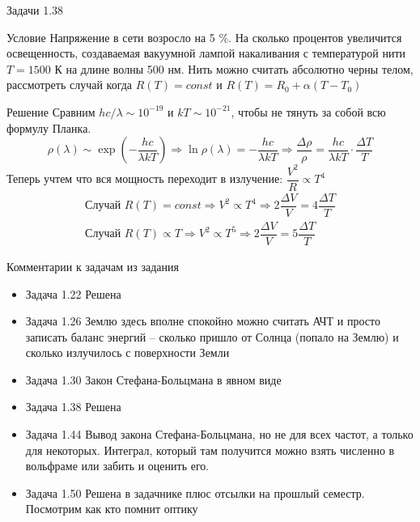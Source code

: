\documentclass[12]{beamer}
\begin{document}
\begin{frame}{Задачи 1.38}\scriptsize
\begin{block}{Условие}
Напряжение в сети возросло на 5 \%. На сколько процентов увеличится освещенность, создаваемая вакуумной лампой накаливания с температурой нити $T = 1500$ К на длине волны 500 нм. Нить можно считать абсолютно черны телом, рассмотреть случай когда $R(T) = const$ и $R(T) = R_0 + \alpha (T - T_0)$
\end{block}
\begin{block}{Решение}
Сравним $hc/\lambda \sim 10^{-19}$ и $kT\sim10^{-21}$, чтобы не тянуть за собой всю формулу Планка.
\begin{equation*}
    \rho(\lambda) \sim \exp{\left(-\dfrac{hc}{\lambda kT} \right)} \Rightarrow \ln{\rho(\lambda)} = -\dfrac{hc}{\lambda kT} \Rightarrow \dfrac{\Delta \rho}{\rho} = \dfrac{hc}{\lambda kT} \cdot \dfrac{\Delta T}{T}
\end{equation*}
Теперь учтем что вся мощность переходит в излучение: $\dfrac{V^2}{R} \propto T^4$
\begin{gather*}
    \text{Случай } R(T) = const \Rightarrow V^2 \propto T^4 \Rightarrow 2\dfrac{\Delta V}{V} = 4\dfrac{\Delta T}{T}\\
    \text{Случай } R(T) \propto T \Rightarrow V^2 \propto T^5 \Rightarrow 2\dfrac{\Delta V}{V} = 5\dfrac{\Delta T}{T}
\end{gather*}
\end{block}
\end{frame}

\begin{frame}[t]{Комментарии к задачам из задания}\scriptsize
\begin{itemize}
    \item Задача 1.22 Решена
\item Задача 1.26 Землю здесь вполне спокойно можно считать АЧТ и просто записать баланс энергий -- сколько пришло от Солнца (попало на Землю) и сколько излучилось с поверхности Земли
\item Задача 1.30 Закон Стефана-Больцмана в явном виде
\item Задача 1.38 Решена
\item Задача 1.44 Вывод закона Стефана-Больцмана, но не для всех частот, а только для некоторых. Интеграл, который там получится можно взять численно в вольфраме или забить и оценить его.
\item Задача 1.50 Решена в задачнике плюс отсылки на прошлый семестр. Посмотрим как кто помнит оптику
\end{itemize}
\end{frame}
\end{document}
